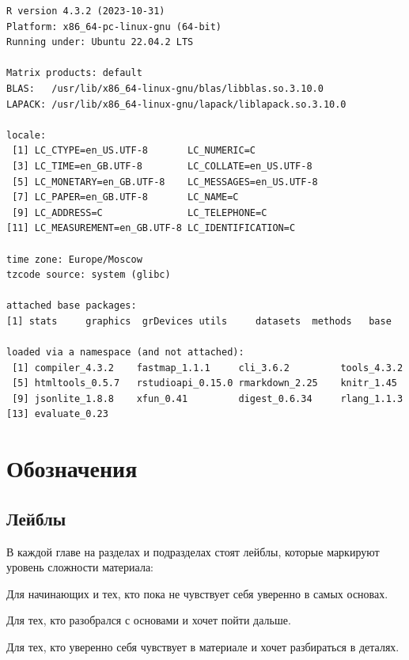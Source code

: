 \documentclass[
  letterpaper,
]{scrbook}
\theoremstyle{definition}
\theoremstyle{remark}
\begin{document}
\begin{verbatim}
R version 4.3.2 (2023-10-31)
Platform: x86_64-pc-linux-gnu (64-bit)
Running under: Ubuntu 22.04.2 LTS

Matrix products: default
BLAS:   /usr/lib/x86_64-linux-gnu/blas/libblas.so.3.10.0 
LAPACK: /usr/lib/x86_64-linux-gnu/lapack/liblapack.so.3.10.0

locale:
 [1] LC_CTYPE=en_US.UTF-8       LC_NUMERIC=C              
 [3] LC_TIME=en_GB.UTF-8        LC_COLLATE=en_US.UTF-8    
 [5] LC_MONETARY=en_GB.UTF-8    LC_MESSAGES=en_US.UTF-8   
 [7] LC_PAPER=en_GB.UTF-8       LC_NAME=C                 
 [9] LC_ADDRESS=C               LC_TELEPHONE=C            
[11] LC_MEASUREMENT=en_GB.UTF-8 LC_IDENTIFICATION=C       

time zone: Europe/Moscow
tzcode source: system (glibc)

attached base packages:
[1] stats     graphics  grDevices utils     datasets  methods   base     

loaded via a namespace (and not attached):
 [1] compiler_4.3.2    fastmap_1.1.1     cli_3.6.2         tools_4.3.2      
 [5] htmltools_0.5.7   rstudioapi_0.15.0 rmarkdown_2.25    knitr_1.45       
 [9] jsonlite_1.8.8    xfun_0.41         digest_0.6.34     rlang_1.1.3      
[13] evaluate_0.23    
\end{verbatim}


\chapter*{Обозначения}\label{book_signs}


\section*{Лейблы}\label{book_labels}


В каждой главе на разделах и подразделах стоят лейблы, которые маркируют
уровень сложности материала:

Для начинающих и тех, кто пока не чувствует себя уверенно в самых
основах.

Для тех, кто разобрался с основами и хочет пойти дальше.

Для тех, кто уверенно себя чувствует в материале и хочет разбираться в
деталях.
\end{document}
